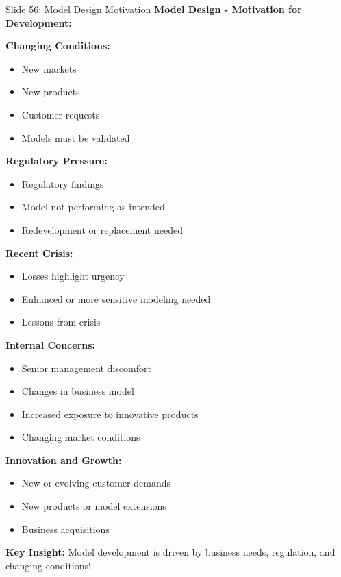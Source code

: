 \documentclass[8pt]{beamer}
\begin{document}
	\begin{frame}{Slide 56: Model Design Motivation}
		\fontsize{6.5}{7.5}\selectfont
		\textbf{Model Design - Motivation for Development:}
		
		\vspace{0.1cm}
		\textbf{Changing Conditions:}
		\begin{itemize}
			\item New markets
			\item New products
			\item Customer requests
			\item Models must be validated
		\end{itemize}
		
		\vspace{0.1cm}
		\textbf{Regulatory Pressure:}
		\begin{itemize}
			\item Regulatory findings
			\item Model not performing as intended
			\item Redevelopment or replacement needed
		\end{itemize}
		
		\vspace{0.1cm}
		\textbf{Recent Crisis:}
		\begin{itemize}
			\item Losses highlight urgency
			\item Enhanced or more sensitive modeling needed
			\item Lessons from crisis
		\end{itemize}
		
		\vspace{0.1cm}
		\textbf{Internal Concerns:}
		\begin{itemize}
			\item Senior management discomfort
			\item Changes in business model
			\item Increased exposure to innovative products
			\item Changing market conditions
		\end{itemize}
		
		\vspace{0.1cm}
		\textbf{Innovation and Growth:}
		\begin{itemize}
			\item New or evolving customer demands
			\item New products or model extensions
			\item Business acquisitions
		\end{itemize}
		
		\textcolor{myblue}{\textbf{Key Insight:}} Model development is driven by \textcolor{myblue}{business needs, regulation, and changing conditions}!
	\end{frame}
	
\end{document}
